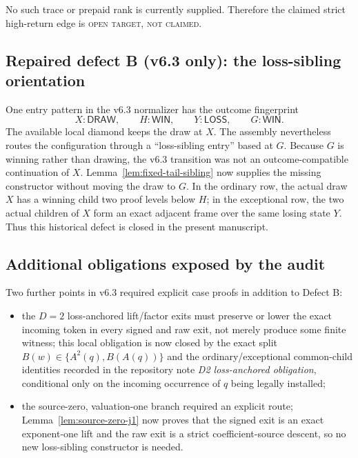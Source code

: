 \documentclass[11pt]{article}
\theoremstyle{definition}
\newcommand{\Win}{\mathsf{WIN}}
\newcommand{\Loss}{\mathsf{LOSS}}
\newcommand{\Draw}{\mathsf{DRAW}}
\newcommand{\openstatus}{\textsc{open target, not claimed}}
\begin{document}
No such trace or prepaid rank is currently supplied.  Therefore the claimed
strict high-return edge is \openstatus.

\subsection{Repaired defect B (v6.3 only): the loss-sibling orientation}

One entry pattern in the v6.3 normalizer has the outcome fingerprint
\[
  X:\Draw,\qquad H:\Win,\qquad Y:\Loss,\qquad G:\Win.
\]
The available local diamond keeps the draw at $X$.  The assembly nevertheless
routes the configuration through a ``loss-sibling entry'' based at $G$.
Because $G$ is winning rather than drawing, the v6.3 transition was not an
outcome-compatible continuation of $X$.  Lemma~\ref{lem:fixed-tail-sibling}
now supplies the missing constructor without moving the draw to $G$.  In the
ordinary row, the actual draw $X$ has a winning child two proof levels below
$H$; in the exceptional row, the two actual children of $X$ form an exact
adjacent frame over the same losing state $Y$.  Thus this historical defect
is closed in the present manuscript.

\subsection{Additional obligations exposed by the audit}

Two further points in v6.3 required explicit case proofs in addition to
Defect B:

\begin{itemize}
\item the $D=2$ loss-anchored lift/factor exits must preserve or lower the
      exact incoming token in every signed and raw exit, not merely produce
      some finite witness; this local obligation is now closed by the exact
      split $B(w)\in\{A^2(q),B(A(q))\}$ and the ordinary/exceptional
      common-child identities recorded in the repository note
      \emph{D2 loss-anchored obligation}, conditional only on the incoming
      occurrence of $q$ being legally installed;
\item the source-zero, valuation-one branch required an explicit route;
      Lemma~\ref{lem:source-zero-j1} now proves that the signed exit is an
      exact exponent-one lift and the raw exit is a strict coefficient-source
      descent, so no new loss-sibling constructor is needed.
\end{itemize}
\end{document}

